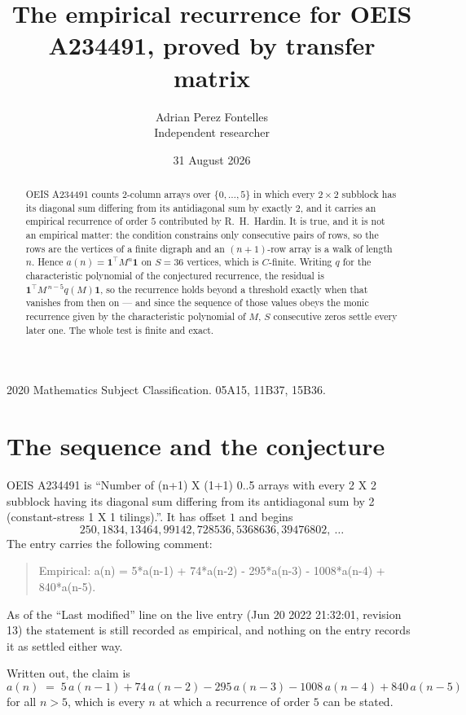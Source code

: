 \documentclass[11pt,a4paper]{article}
\title{The empirical recurrence for OEIS A234491, proved by transfer matrix}
\author{Adrian Perez Fontelles\\ \small Independent researcher}
\date{31 August 2026}
\theoremstyle{plain}
\theoremstyle{definition}
\begin{document}
\maketitle

\begin{abstract}
OEIS A234491 counts $2$-column arrays over $\{0,\dots,5\}$ in which every
$2\times2$ subblock has its diagonal sum differing from its antidiagonal sum by
exactly $2$, and it
carries an empirical recurrence of order $5$ contributed by R.~H.~Hardin. It is true,
and it is not an empirical matter: the condition constrains only consecutive pairs of rows,
so the rows are the vertices of a finite digraph and an $(n+1)$-row array is a walk of
length $n$. Hence $a(n)=\mathbf{1}^{\!\top}M^{n}\mathbf{1}$ on $S=36$ vertices, which
is $C$-finite. Writing $q$ for the characteristic polynomial of the conjectured recurrence,
the residual is $\mathbf{1}^{\!\top}M^{\,n-5}q(M)\mathbf{1}$, so the recurrence
holds beyond a threshold exactly when that vanishes from then on --- and since the sequence
of those values obeys the monic recurrence given by the characteristic polynomial of $M$,
$S$ consecutive zeros settle every later one. The whole test is finite and exact.
\end{abstract}

\noindent\small 2020 Mathematics Subject Classification. 05A15, 11B37, 15B36.\normalsize

\section{The sequence and the conjecture}

OEIS A234491 is ``Number of (n+1) X (1+1) 0..5 arrays with every 2 X 2 subblock having its diagonal sum differing from its antidiagonal sum by 2 (constant-stress 1 X 1 tilings).''. It has offset
$1$ and begins
\[
250, 1834, 13464, 99142, 728536, 5368636, 39476802,\ \dots
\]
The entry carries the following comment:
\begin{quote}\small
Empirical: a(n) = 5*a(n-1) + 74*a(n-2) - 295*a(n-3) - 1008*a(n-4) + 840*a(n-5).
\end{quote}
As of the ``Last modified'' line on the live entry (Jun 20 2022 21:32:01, revision 13) the statement is
still recorded as empirical, and nothing on the entry records it as settled either way.

Written out, the claim is
\begin{equation}\label{eq:conj}
a(n)\;=\;5\,a(n-1) + 74\,a(n-2) - 295\,a(n-3) - 1008\,a(n-4) + 840\,a(n-5)
\end{equation}
for all $n>5$, which is every $n$ at which a recurrence of order $5$ can be
stated.
\end{document}
